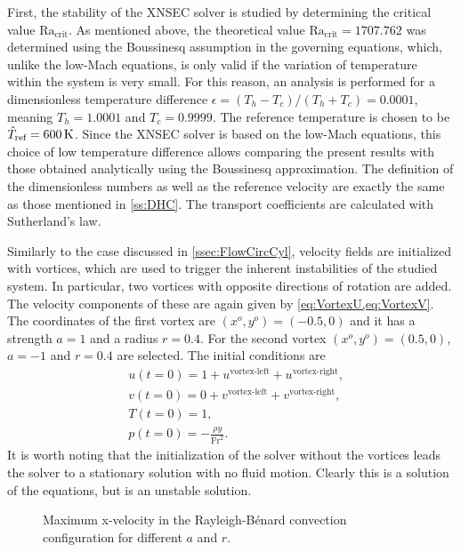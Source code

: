 First, the stability of the XNSEC solver is studied by determining the critical value $\text{Ra}_{\text{crit}}$. As mentioned above, the theoretical value $\text{Ra}_{\text{crit}} = 1707.762$ was determined using the Boussinesq  assumption in the governing equations, which, unlike the low-Mach equations, is only valid if the variation of temperature within the system is very small. For this reason, an analysis is performed for a dimensionless temperature difference $\epsilon = (T_h-T_c)/(T_h+T_c) = 0.0001$, meaning $T_h =1.0001$ and $T_c = 0.9999$. The reference temperature is chosen to be $\hat T_{\text{ref}} = \SI{600}{\kelvin}$. Since the XNSEC solver is based on the low-Mach equations, this choice of low temperature difference allows comparing the present results with those obtained analytically using the Boussinesq approximation. The definition of the dimensionless numbers as well as the reference velocity are exactly the same as those mentioned in \cref{ss:DHC}. The transport coefficients are calculated with Sutherland's law.

Similarly to the case discussed in \cref{ssec:FlowCircCyl}, velocity fields are initialized with vortices, which are used to trigger the inherent instabilities of the studied system. In particular, two vortices with opposite directions of rotation are added. The velocity components of these are again given by \cref{eq:VortexU,eq:VortexV}. The coordinates of the first vortex are $(x^o,y^o) = (-0.5,0)$ and it has a strength $a = 1$ and a radius $r=0.4$. For the second vortex $(x^o,y^o) = (0.5,0)$, $a = -1$ and $r=0.4$ are selected. The initial conditions are
\begin{subequations} 
	\begin{align}
		&u(t=0) = 1 + u^{\text{vortex-left}} + u^{\text{vortex-right}},  \\
		&v(t=0) = 0 + v^{\text{vortex-left}}+ v^{\text{vortex-right}},  \\
		&T(t=0) = 1,\\
		&p(t=0) = -\frac{\rho y}{\text{Fr}^2}.
	\end{align}
\end{subequations}
It is worth noting that the initialization of the solver without the vortices leads the solver to a stationary solution with no fluid motion. Clearly this is a solution of the equations, but is an unstable solution.
\begin{figure}[bt]
	\centering
	\pgfplotsset{width=0.29\textwidth, compat=1.3}
	\hspace{0.2cm}
	\caption{Maximum x-velocity in the Rayleigh-Bénard convection configuration for different $a$ and $r$.}
	\label{fig:RayBerMaxVel}
\end{figure}

